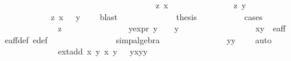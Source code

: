 \begin{isabellebody}
\ \ \ \ \ \ \ \ \ \ \ \ \isanewline
\ \ \ \ \ \ \ \ \ \ \isamarkupfalse%
\ \isanewline
\ \ \ \ \ \ \ \ \ \ \ \ {\isacharparenleft}z{}{\isacharparenright}\ {\isachardoublequoteopen}x\ {\isacharequal}\ {}{\isachardoublequoteclose}\ {\isacharbar}\isanewline
\ \ \ \ \ \ \ \ \ \ \ \ {\isacharparenleft}z{}{\isacharparenright}\ {\isachardoublequoteopen}y\ {\isacharequal}\ {}{\isachardoublequoteclose}\ {\isacharbar}\isanewline
\ \ \ \ \ \ \ \ \ \ \ \ {\isacharparenleft}z{}{\isacharparenright}\ {\isachardoublequoteopen}x\ {\isasymnoteq}\ {}{\isachardoublequoteclose}\ {\isachardoublequoteopen}y\ {\isasymnoteq}\ {}{\isachardoublequoteclose}\ \isamarkupfalse%
\ blast\isanewline
\ \ \ \ \ \ \ \ \ \ \isamarkupfalse%
\ \isamarkupfalse%
\ {\isacharquery}thesis\isanewline
\ \ \ \ \ \ \ \ \ \ \isamarkupfalse%
{\isacharparenleft}cases{\isacharparenright}\isanewline
\ \ \ \ \ \ \ \ \ \ \ \ \isamarkupfalse%
\ z{}\isanewline
\ \ \ \ \ \ \ \ \ \ \ \ \isamarkupfalse%
\ \isamarkupfalse%
\ y{\isacharunderscore}expr{\isacharcolon}\ {\isachardoublequoteopen}y\ {\isacharequal}\ {}\ {\isasymor}\ y\ {\isacharequal}\ {\isacharminus}{}{\isachardoublequoteclose}\isanewline
\ \ \ \ \ \ \ \ \ \ \ \ \ \ \isamarkupfalse%
\ {\isacartoucheopen}{\isacharparenleft}x{\isacharcomma}y{\isacharparenright}\ {\isasymin}\ e{\isacharunderscore}aff{\isacartoucheclose}\ \isamarkupfalse%
\ e{\isacharunderscore}aff{\isacharunderscore}def\ e{\isacharprime}{\isacharunderscore}def\ \isanewline
\ \ \ \ \ \ \ \ \ \ \ \ \ \ \isamarkupfalse%
{\isacharparenleft}simp{\isacharcomma}algebra{\isacharparenright}\isanewline
\ \ \ \ \ \ \ \ \ \ \ \ \isamarkupfalse%
\ \isamarkupfalse%
\ {\isachardoublequoteopen}y{\isacharasterisk}y\ {\isacharequal}\ {}{\isachardoublequoteclose}\ \isamarkupfalse%
\ auto\isanewline
\ \ \ \ \ \ \ \ \ \ \ \ \isamarkupfalse%
\ {\isachardoublequoteopen}ext{\isacharunderscore}add\ {\isacharparenleft}x{\isacharcomma}\ y{\isacharparenright}\ {\isacharparenleft}x{\isacharprime}{\isacharcomma}\ y{\isacharprime}{\isacharparenright}\ {\isacharequal}\ {\isasymrho}\ {\isacharparenleft}y{\isacharasterisk}x{\isacharprime}{\isacharcomma}y{\isacharasterisk}y{\isacharprime}{\isacharparenright}{\isachardoublequoteclose}\isanewline

\end{isabellebody}
